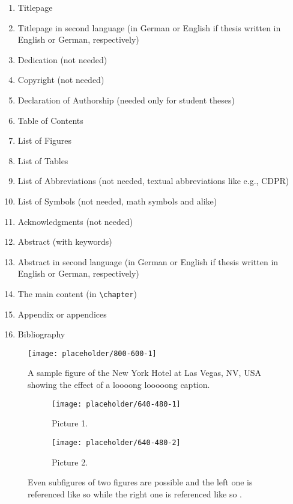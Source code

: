 \begin{enumerate}
    \item Titlepage
    \item Titlepage in second language (in German or English if thesis written in English or German, respectively)
    \item Dedication (not needed)
    \item Copyright (not needed)
    \item Declaration of Authorship (needed only for student theses)
    \item Table of Contents
    \item List of Figures
    \item List of Tables
    \item List of Abbreviations (not needed, textual abbreviations like e.g., CDPR)
    \item List of Symbols (not needed, math symbols and alike)
    \item Acknowledgments (not needed)
    \item Abstract (with keywords)
    \item Abstract in second language (in German or English if thesis written in English or German, respectively)
    \item The main content (in \verb|\chapter|)
    \item Appendix or appendices
    \item Bibliography
\end{enumerate}

\begin{figure}
    \centering
    \texttt{[image: placeholder/800-600-1]}
    \caption{A sample figure of the New York Hotel at Las Vegas, NV, USA showing the effect of a loooong looooong caption.}
    \label{fig:sample-figure}
\end{figure}

\begin{figure}
    \centering
    \begin{subfigure}[b]{0.49\textwidth}
        \texttt{[image: placeholder/640-480-1]}
        \caption{Picture 1.}
        \label{fig:subfigures-two:1}
    \end{subfigure}
    \hfill
    \begin{subfigure}[b]{0.49\textwidth}
        \texttt{[image: placeholder/640-480-2]}
        \caption{Picture 2.}
        \label{fig:subfigures-two:2}
    \end{subfigure}
    
    \caption{Even subfigures of two figures are possible and the left one is referenced like so  while the right one is referenced like so .}
    \label{fig:subfigures-two}
\end{figure}

